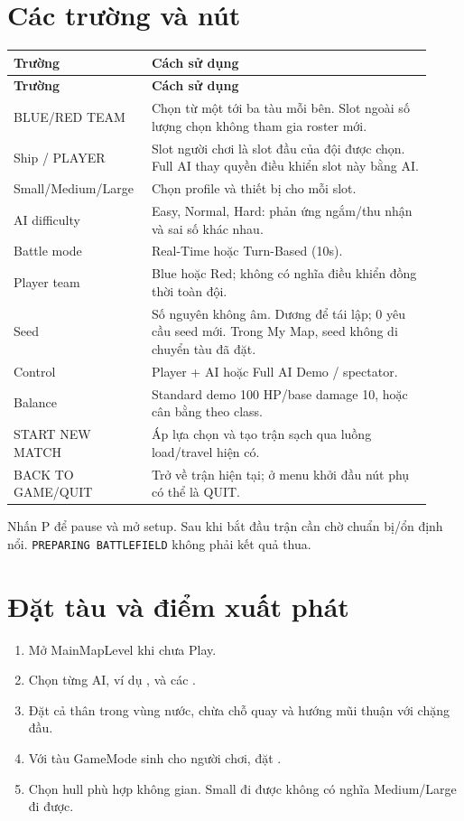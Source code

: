 \section{Các trường và nút}
\begin{longtable}{@{}p{0.28\linewidth}p{0.64\linewidth}@{}}
\toprule
\textbf{Trường} & \textbf{Cách sử dụng}\\ \midrule
\endfirsthead
\toprule
\textbf{Trường} & \textbf{Cách sử dụng}\\ \midrule
\endhead
BLUE/RED TEAM & Chọn từ một tới ba tàu mỗi bên. Slot ngoài số lượng chọn không tham gia roster mới.\\
Ship / PLAYER & Slot người chơi là slot đầu của đội được chọn. Full AI thay quyền điều khiển slot này bằng AI.\\
Small/Medium/Large & Chọn profile và thiết bị cho mỗi slot.\\
AI difficulty & Easy, Normal, Hard: phản ứng ngắm/thu nhận và sai số khác nhau.\\
Battle mode & Real-Time hoặc Turn-Based (10s).\\
Player team & Blue hoặc Red; không có nghĩa điều khiển đồng thời toàn đội.\\
Seed & Số nguyên không âm. Dương để tái lập; 0 yêu cầu seed mới. Trong My Map, seed không di chuyển tàu đã đặt.\\
Control & Player + AI hoặc Full AI Demo / spectator.\\
Balance & Standard demo 100 HP/base damage 10, hoặc cân bằng theo class.\\
START NEW MATCH & Áp lựa chọn và tạo trận sạch qua luồng load/travel hiện có.\\
BACK TO GAME/QUIT & Trở về trận hiện tại; ở menu khởi đầu nút phụ có thể là QUIT.\\
\bottomrule
\end{longtable}
Nhấn P để pause và mở setup. Sau khi bắt đầu trận cần chờ chuẩn bị/ổn định nổi. \texttt{PREPARING BATTLEFIELD} không phải kết quả thua.

\section{Đặt tàu và điểm xuất phát}
\begin{enumerate}
 \item Mở MainMapLevel khi chưa Play.
 \item Chọn từng AI, ví dụ ,  và các .
 \item Đặt cả thân trong vùng nước, chừa chỗ quay và hướng mũi thuận với chặng đầu.
 \item Với tàu GameMode sinh cho người chơi, đặt .
 \item Chọn hull phù hợp không gian. Small đi được không có nghĩa Medium/Large đi được.
\end{enumerate}

